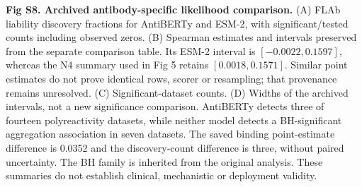 \caption{{\bf Fig S8. Archived antibody-specific likelihood comparison.} (A) FLAb liability discovery fractions for AntiBERTy and ESM-2, with significant/tested counts including observed zeros. (B) Spearman estimates and intervals preserved from the separate comparison table. Its ESM-2 interval is $[-0.0022,0.1597]$, whereas the N4 summary used in Fig 5 retains $[0.0018,0.1571]$. Similar point estimates do not prove identical rows, scorer or resampling; that provenance remains unresolved. (C) Significant-dataset counts. (D) Widths of the archived intervals, not a new significance comparison. AntiBERTy detects three of fourteen polyreactivity datasets, while neither model detects a BH-significant aggregation association in seven datasets. The saved binding point-estimate difference is 0.0352 and the discovery-count difference is three, without paired uncertainty. The BH family is inherited from the original analysis. These summaries do not establish clinical, mechanistic or deployment validity.}
